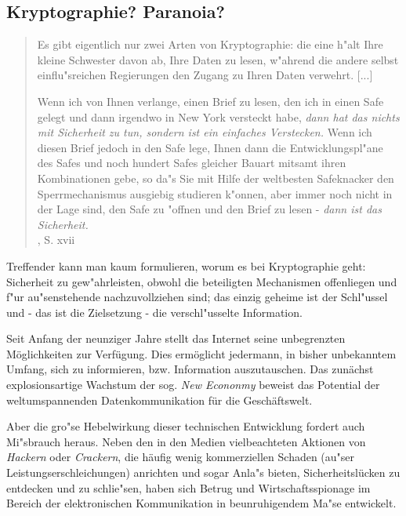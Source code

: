 \subsection{Kryptographie? Paranoia?}
\label{KryptographieParanoia}

\begin{quote}
  Es gibt eigentlich nur zwei Arten von Kryptographie: die eine h"alt
  Ihre kleine Schwester davon ab, Ihre Daten zu lesen, w"ahrend die
  andere selbst einflu"sreichen Regierungen den Zugang zu Ihren Daten
  verwehrt. [...]
  
  Wenn ich von Ihnen verlange, einen Brief zu lesen, den ich in einen
  Safe gelegt und dann irgendwo in New York versteckt habe,
  \textit{dann hat das nichts mit Sicherheit zu tun, sondern ist ein
    einfaches Verstecken.} Wenn ich diesen Brief jedoch in den Safe
  lege, Ihnen dann die Entwicklungspl"ane des Safes und noch hundert
  Safes gleicher Bauart mitsamt ihren Kombinationen gebe, so da"s Sie
  mit Hilfe der weltbesten Safeknacker den Sperrmechanismus ausgiebig
  studieren k"onnen, aber immer noch nicht in der Lage sind, den Safe
  zu "offnen und den Brief zu lesen - \textit{dann ist das
    Sicherheit.} \\
  \cite{schneier96}, S. xvii
\end{quote}

Treffender kann man kaum formulieren, worum es bei Kryptographie geht:
Sicherheit zu gew"ahrleisten, obwohl die beteiligten Mechanismen
offenliegen und f"ur au"senstehende nachzuvollziehen sind; das einzig
geheime ist der Schl"ussel und - das ist die Zielsetzung - die
verschl"usselte Information.

Seit Anfang der neunziger Jahre stellt das Internet seine unbegrenzten
M\"oglichkeiten zur Verf\"ugung. Dies erm\"oglicht jedermann, in
bisher unbekanntem Umfang, sich zu informieren, bzw. Information
auszutauschen. Das zun\"achst explosionsartige Wachstum der sog.
\textit{New Econonmy} beweist das Potential der weltumspannenden
Datenkommunikation f\"ur die Gesch\"aftswelt.

Aber die gro"se Hebelwirkung dieser technischen Entwicklung fordert
auch Mi"sbrauch heraus.  Neben den in den Medien vielbeachteten
Aktionen von \textit{Hackern} oder \textit{Crackern}, die h\"aufig
wenig kommerziellen Schaden (au"ser Leistungserschleichungen)
anrichten und sogar Anla"s bieten, Sicherheitsl\"ucken zu entdecken
und zu schlie"sen, haben sich Betrug und Wirtschaftsspionage im
Bereich der elektronischen Kommunikation in beunruhigendem Ma"se
entwickelt.

